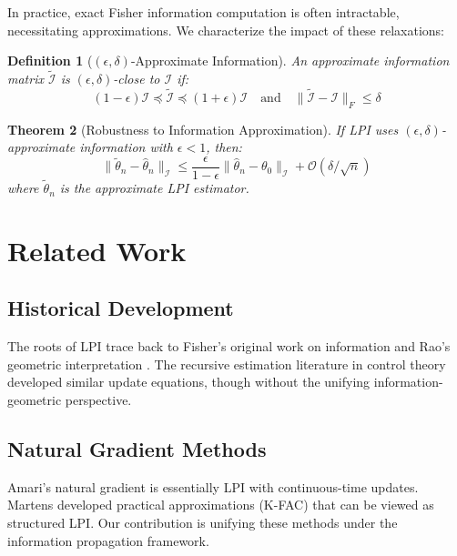 \documentclass[11pt]{article}
\newtheorem{theorem}{Theorem}
\newtheorem{definition}[theorem]{Definition}
\begin{document}
In practice, exact Fisher information computation is often intractable, necessitating approximations. We characterize the impact of these relaxations:

\begin{definition}[$(\epsilon, \delta)$-Approximate Information]
An approximate information matrix $\tilde{\mathcal{I}}$ is $(\epsilon, \delta)$-close to $\mathcal{I}$ if:
\begin{equation}
(1-\epsilon)\mathcal{I} \preceq \tilde{\mathcal{I}} \preceq (1+\epsilon)\mathcal{I} \quad \text{and} \quad \|\tilde{\mathcal{I}} - \mathcal{I}\|_F \leq \delta
\end{equation}
\end{definition}

\begin{theorem}[Robustness to Information Approximation]
\label{thm:approximation}
If LPI uses $(\epsilon, \delta)$-approximate information with $\epsilon < 1$, then:
\begin{equation}
\|\tilde{\theta}_n - \hat{\theta}_n\|_{\mathcal{I}} \leq \frac{\epsilon}{1-\epsilon}\|\hat{\theta}_n - \theta_0\|_{\mathcal{I}} + \mathcal{O}(\delta/\sqrt{n})
\end{equation}
where $\tilde{\theta}_n$ is the approximate LPI estimator.
\end{theorem}

\section{Related Work}

\subsection{Historical Development}

The roots of LPI trace back to Fisher's original work on information \cite{fisher1925statistical} and Rao's geometric interpretation \cite{rao1945information}. The recursive estimation literature in control theory \cite{ljung1983theory} developed similar update equations, though without the unifying information-geometric perspective.

\subsection{Natural Gradient Methods}

Amari's natural gradient \cite{amari1998natural} is essentially LPI with continuous-time updates. Martens \cite{martens2015optimizing} developed practical approximations (K-FAC) that can be viewed as structured LPI. Our contribution is unifying these methods under the information propagation framework.
\end{document}
